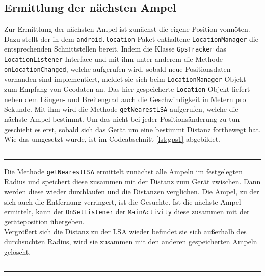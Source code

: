 \subsection{Ermittlung der nächsten Ampel}
Zur Ermittlung der nächsten Ampel ist zunächst die eigene Position vonnöten. Dazu stellt der in dem \texttt{android.location}-Paket enthaltene \texttt{LocationManager} die entsprechenden Schnittstellen bereit. Indem die Klasse \texttt{GpsTracker} das \texttt{LocationListener}-Interface und mit ihm unter anderem die Methode \texttt{onLocationChanged}, welche aufgerufen wird, sobald neue Positionsdaten vorhanden sind implementiert, meldet sie sich beim \texttt{LocationManager}-Objekt zum Empfang von Geodaten an. Das hier gespeicherte \texttt{Location}-Objekt liefert neben dem Längen- und Breitengrad auch die Geschwindigkeit in Metern pro Sekunde. Mit ihm wird die Methode \texttt{getNearestLSA} aufgerufen, welche die nächste Ampel bestimmt. Um das nicht bei jeder Positionsänderung zu tun geschieht es erst, sobald sich das Gerät um eine bestimmt Distanz fortbewegt hat. Wie das umgesetzt wurde, ist im Codeabschnitt \ref{lst:gps1} abgebildet.\\
\begin{center}
\rule{35em}{0.5pt}

\rule{35em}{0.5pt}
\end{center}
Die Methode \texttt{getNearestLSA} ermittelt zunächst alle Ampeln im festgelegten Radius und speichert diese zusammen mit der Distanz zum Gerät zwischen. Dann werden diese wieder durchlaufen und die Distanzen verglichen. Die Ampel, zu der sich auch die Entfernung verringert, ist die Gesuchte. Ist die nächste Ampel ermittelt, kann der \texttt{OnSetListener} der \texttt{MainActivity} diese zusammen mit der geräteposition übergeben. \\
Vergrößert sich die Distanz zu der \gls{LSA} wieder befindet sie sich außerhalb des durchsuchten Radius, wird sie zusammen mit den anderen gespeicherten Ampeln gelöscht. 
\begin{center}
\rule{35em}{0.5pt}

\rule{35em}{0.5pt}
\end{center}
%
%
